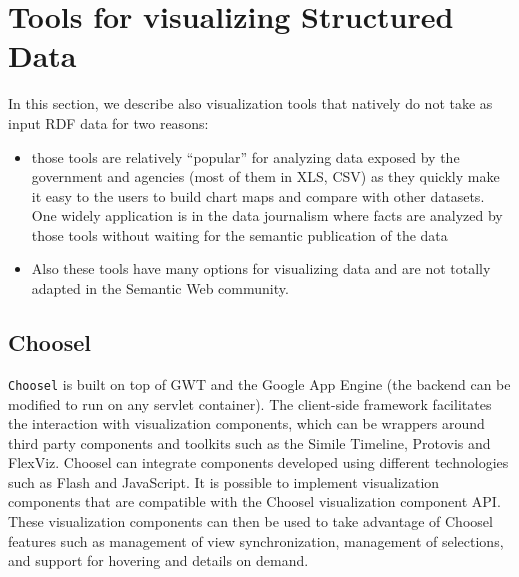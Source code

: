 
\section{Tools for visualizing Structured Data}
\label{sec:strucdataviz}
In this section, we describe also visualization tools that natively do not take as input RDF data for two reasons: 
\begin{itemize}
\item those tools are relatively ``popular'' for analyzing data exposed by the government and agencies  (most of them in XLS, CSV) as they quickly make it easy to the users  to build chart  maps and compare with other datasets. One widely application is in the data journalism  where facts are analyzed by those tools without waiting for the semantic publication of the data 
\item Also these tools have many options for visualizing data and are not totally adapted in the Semantic Web community.

\end{itemize}

\subsection{Choosel}
\label{sec:choosel}

\texttt{Choosel} \cite{lars2010} is built on top of GWT  and the Google App Engine  (the backend can be modified to run on any servlet container). The client-side framework facilitates the interaction with visualization components, which can be wrappers around third party components and toolkits such as the Simile Timeline, Protovis and FlexViz. Choosel can integrate components developed using different technologies such as Flash and JavaScript. It is possible to implement visualization components that are compatible with the Choosel visualization component API. These visualization components can then be used to take advantage of Choosel features such as management of view synchronization, management of selections, and support for hovering and details on demand.

